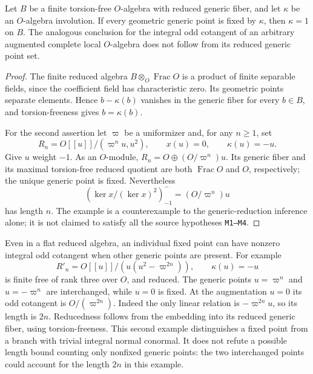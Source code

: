 \begin{lemma}
Let $B$ be a finite torsion-free $O$-algebra with reduced generic
fiber, and let $\kappa$ be an $O$-algebra involution.  If every
geometric generic point is fixed by $\kappa$, then $\kappa=1$ on
$B$.  The analogous conclusion for the integral odd cotangent
of an arbitrary augmented complete local $O$-algebra does not
follow from its reduced generic point set.
\end{lemma}
\begin{proof}
The finite reduced algebra $B\otimes_O\operatorname{Frac}O$
is a product of finite separable fields, since the coefficient
field has characteristic zero.  Its geometric points separate
elements.  Hence $b-\kappa(b)$ vanishes in the generic fiber
for every $b\in B$, and torsion-freeness gives $b=\kappa(b)$.

For the second assertion let $\varpi$ be a uniformizer and, for
any $n\geq1$, set
\[
 R_n=O[[u]]/(\varpi^n u,u^2),\qquad
 x(u)=0,\qquad \kappa(u)=-u.                                \tag{KP.3}
\]
Give $u$ weight $-1$.  As an $O$-module,
$R_n=O\oplus (O/\varpi^n)u$.  Its generic fiber and its maximal
torsion-free reduced quotient are both $\operatorname{Frac}O$
and $O$, respectively; the unique generic point is fixed.
Nevertheless
\[
       (\ker x/(\ker x)^2)_{-1}^{-}
                    =(O/\varpi^n)u                           \tag{KP.4}
\]
has length $n$.  The example is a counterexample to the
generic-reduction inference alone; it is not claimed to satisfy
all the source hypotheses \texttt{M1--M4}.
\end{proof}

Even in a flat reduced algebra, an individual fixed point
can have nonzero integral odd cotangent when other generic
points are present.  For example
\[
 R'_n=O[[u]]/(u(u^2-\varpi^{2n})),\qquad \kappa(u)=-u          \tag{KP.5}
\]
is finite free of rank three over $O$, and reduced.  The generic
points $u=\varpi^n$ and $u=-\varpi^n$ are interchanged, while
$u=0$ is fixed.  At the augmentation $u=0$ its odd cotangent is
$O/(\varpi^{2n})$.  Indeed the only linear relation is
$-\varpi^{2n}u$, so its length is $2n$.  Reducedness follows
from the embedding into its reduced generic fiber, using
torsion-freeness.  This second example distinguishes a fixed
point from a branch with trivial integral normal conormal.
It does not refute a possible length bound counting only
nonfixed generic points: the two interchanged points could
account for the length $2n$ in this example.


